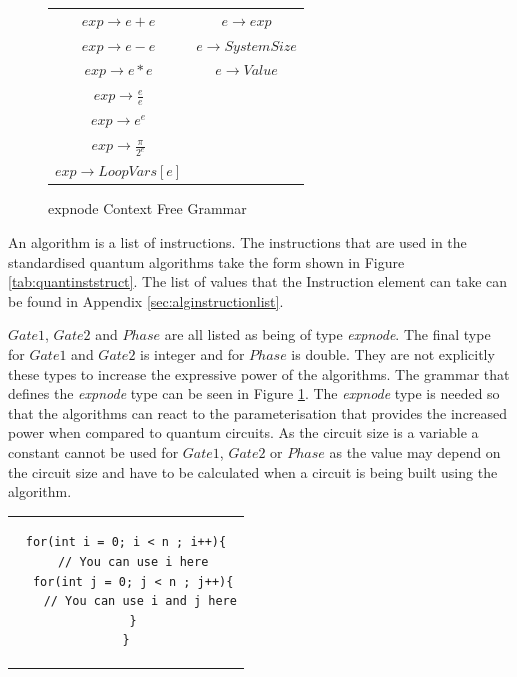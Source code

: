 \begin{figure}
\centering
 \begin{tabular}{|c|c|}
\hline
$exp \rightarrow e + e$ & $e \rightarrow exp$ \\
$exp \rightarrow e - e$ &  $e \rightarrow SystemSize$ \\
$exp \rightarrow e * e$ &  $e \rightarrow Value$ \\
$exp \rightarrow \frac{e}{e}$ &   \\
$exp \rightarrow e^e$ &   \\
$exp \rightarrow \frac{\pi}{2^e}$ &   \\
$exp \rightarrow LoopVars[e]$ &   \\
\hline
 \end{tabular}
\caption{expnode Context Free Grammar}
\label{tab:expnodecontext}
\end{figure}

An algorithm is a list of instructions.
The instructions that are used in the standardised quantum algorithms take the form shown in Figure \ref{tab:quantinststruct}.
The list of values that the Instruction element can take can be found in Appendix \ref{sec:alginstructionlist}.

$Gate1$, $Gate2$ and $Phase$ are all listed as being of type \emph{expnode}.
The final type for $Gate1$ and $Gate2$ is integer and for $Phase$ is double.
They are not explicitly these types to increase the expressive power of the algorithms.
The grammar that defines the \emph{expnode} type can be seen in Figure \ref{tab:expnodecontext}.
The \emph{expnode} type is needed so that the algorithms can react to the parameterisation that provides the increased power when compared to quantum circuits.
As the circuit size is a variable a constant cannot be used for $Gate1$, $Gate2$ or $Phase$ as the value may depend on the circuit size and have to be calculated when a circuit is being built using the algorithm.

\lstset{numbers=left,language=Java}
\begin{center}
\begin{tabular}{c}
\begin{lstlisting}
for(int i = 0; i < n ; i++){
  // You can use i here
  for(int j = 0; j < n ; j++){
    // You can use i and j here
  }
}
\end{lstlisting}
\end{tabular}
\end{center}

